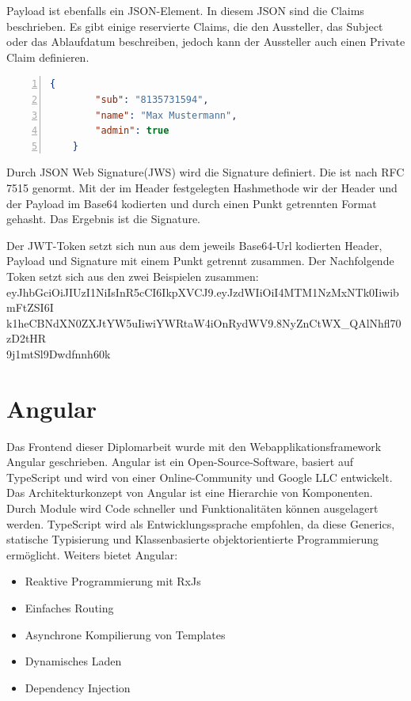 Payload ist ebenfalls ein JSON-Element. In diesem JSON sind die Claims beschrieben. Es gibt einige reservierte Claims, die den Aussteller, das Subject oder das Ablaufdatum beschreiben, jedoch kann der Aussteller auch einen Private Claim definieren.\\
\begin{lstlisting}[caption={JWT-Payload Beispiel},captionpos=b, numbers=left, backgroundcolor=\color{black!10}, language=json]
	{
		"sub": "8135731594",
		"name": "Max Mustermann",
		"admin": true
	}
\end{lstlisting}

Durch JSON Web Signature(JWS) wird die Signature definiert. Die ist nach RFC 7515 genormt. Mit der im Header festgelegten Hashmethode wir der Header und der Payload im Base64 kodierten und durch einen Punkt getrennten Format gehasht. Das Ergebnis ist die Signature.

Der JWT-Token setzt sich nun aus dem jeweils Base64-Url kodierten Header, Payload und Signature mit einem Punkt getrennt zusammen. \autocite{wikiJWT}
Der Nachfolgende Token setzt sich aus den zwei Beispielen zusammen:\\
eyJhbGciOiJIUzI1NiIsInR5cCI6IkpXVCJ9.eyJzdWIiOiI4MTM1NzMxNTk0IiwibmFtZSI6I\\k1heCBNdXN0ZXJtYW5uIiwiYWRtaW4iOnRydWV9.8NyZnCtWX\_QAlNhfl70zD2tHR\\9j1mtSl9Dwdfnnh60k

\section{Angular}
Das Frontend dieser Diplomarbeit wurde mit den Webapplikationsframework Angular geschrieben. Angular ist ein Open-Source-Software, basiert auf TypeScript und wird von einer Online-Community und Google LLC entwickelt.\\
Das Architekturkonzept von Angular ist eine Hierarchie von Komponenten. Durch Module wird Code schneller und Funktionalitäten können ausgelagert werden. TypeScript wird als Entwicklungssprache empfohlen, da diese Generics, statische Typisierung und Klassenbasierte objektorientierte Programmierung ermöglicht. \autocite{wikiAngular}
Weiters bietet Angular:
\begin{itemize}
	\item Reaktive Programmierung mit RxJs
	\item Einfaches Routing
	\item Asynchrone Kompilierung von Templates
	\item Dynamisches Laden
	\item Dependency Injection
\end{itemize}
